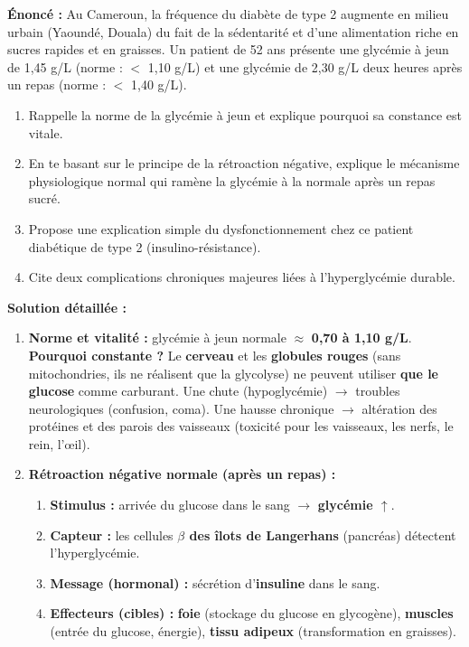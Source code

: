 \documentclass[11pt]{article}
\newcommand{\cle}[1]{{\popxbold\color{popdark}#1}}
\begin{document}
\begin{exoresolu}
    \textbf{Énoncé :} Au Cameroun, la fréquence du diabète de type 2 augmente en milieu urbain (Yaoundé, Douala) du fait de la sédentarité et d'une alimentation riche en sucres rapides et en graisses. Un patient de 52 ans présente une glycémie à jeun de 1,45 g/L (norme : $<$ 1,10 g/L) et une glycémie de 2,30 g/L deux heures après un repas (norme : $<$ 1,40 g/L).
    \begin{enumerate}
        \item Rappelle la norme de la glycémie à jeun et explique pourquoi sa constance est vitale.
        \item En te basant sur le principe de la \cle{rétroaction négative}, explique le mécanisme physiologique normal qui ramène la glycémie à la normale après un repas sucré.
        \item Propose une explication simple du dysfonctionnement chez ce patient diabétique de type 2 (insulino-résistance).
        \item Cite deux complications chroniques majeures liées à l'hyperglycémie durable.
    \end{enumerate}
    \tcblower
    \textbf{Solution détaillée :}
    \begin{enumerate}
        \item \textbf{Norme et vitalité :} glycémie à jeun normale $\approx$ \textbf{0,70 à 1,10 g/L}.
            \textbf{Pourquoi constante ?} Le \textbf{cerveau} et les \textbf{globules rouges} (sans mitochondries, ils ne réalisent que la glycolyse) ne peuvent utiliser \textbf{que le glucose} comme carburant. Une chute (hypoglycémie) $\rightarrow$ troubles neurologiques (confusion, coma). Une hausse chronique $\rightarrow$ altération des protéines et des parois des vaisseaux (toxicité pour les vaisseaux, les nerfs, le rein, l'œil).
        \item \textbf{Rétroaction négative normale (après un repas) :}
            \begin{enumerate}
                \item \textbf{Stimulus :} arrivée du glucose dans le sang $\rightarrow$ \textbf{glycémie $\uparrow$}.
                \item \textbf{Capteur :} les cellules \textbf{$\beta$ des îlots de Langerhans} (pancréas) détectent l'hyperglycémie.
                \item \textbf{Message (hormonal) :} sécrétion d'\textbf{insuline} dans le sang.
                \item \textbf{Effecteurs (cibles) :} \textbf{foie} (stockage du glucose en glycogène), \textbf{muscles} (entrée du glucose, énergie), \textbf{tissu adipeux} (transformation en graisses).

\end{enumerate}
\end{enumerate}
\end{exoresolu}
\end{document}
